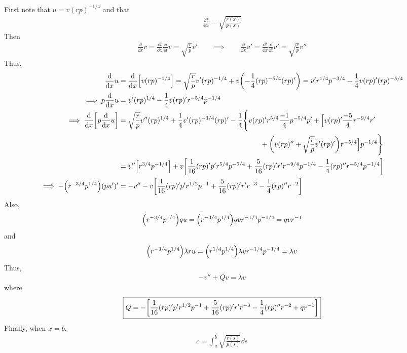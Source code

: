 \documentclass{article} %
\theoremstyle{plain}
\begin{document}
First note that $u = v(rp)^{-1/4}$ and that
\begin{align*}
    \frac{\dd t}{\dd x} = \sqrt{\frac{r(x)}{p(x)}}
\end{align*}
Then
\begin{align*}
    \frac{\dd}{\dd x} v = \frac{\dd t}{\dd x} \frac{\dd}{\dd t} v = \sqrt{\frac{r}{p}}v' \qquad \implies \qquad \frac{\dd}{\dd x} v' = \frac{\dd t}{\dd x}\frac{\dd}{\dd t}v' = \sqrt{\frac{r}{p}}v''
\end{align*}
Thus,
\begin{align*}
    \frac{\dd}{\dd x}u &= \frac{\dd}{\dd x} \qty[v(rp)^{-1/4}] = \sqrt{\frac{r}{p}}v'(rp)^{-1/4} + v\qty(-\frac{1}{4}(rp)^{-5/4}(rp)') = v'r^{1/4}p^{-3/4} - \frac{1}{4}v(rp)'(rp)^{-5/4} \\
    \implies p\frac{\dd}{\dd x}u &= v'(rp)^{1/4} - \frac{1}{4}v(rp)'r^{-5/4}p^{-1/4} \\
    \implies \frac{\dd}{\dd x}\qty[p\frac{\dd}{\dd x}u] &= \sqrt{\frac{r}{p}}v''(rp)^{1/4} + \frac{1}{4}v'(rp)^{-3/4}(rp)' - \frac{1}{4}\Bigg\{v(rp)'r^{5/4}\frac{-1}{4}p^{-5/4}p' + \Big[v(rp)'\frac{-5}{4}r^{-9/4}r' \\
    & \qquad\qquad\qquad\qquad\qquad\qquad\qquad\qquad\qquad\qquad + \qty(v(rp)'' + \sqrt{\frac{r}{p}}v'(rp)')r^{-5/4}\Big]p^{-1/4}\Bigg\} \\
    &= v''\qty[r^{3/4}p^{-1/4}] + v\qty[\frac{1}{16}(rp)'p'r^{5/4}p^{-5/4} + \frac{5}{16}(rp)'r'r^{-9/4}p^{-1/4} - \frac{1}{4}(rp)''r^{-5/4}p^{-1/4}] \\
    \implies -\qty(r^{-3/4}p^{1/4})(pu')' &= -v'' - v\qty[\frac{1}{16}(rp)'p'r^{1/2}p^{-1} + \frac{5}{16}(rp)'r'r^{-3} - \frac{1}{4}(rp)''r^{-2}]
\end{align*}
Also,
\begin{align*}
    \qty(r^{-3/4}p^{1/4})qu = \qty(r^{-3/4}p^{1/4})qvr^{-1/4}p^{-1/4} = qvr^{-1}
\end{align*}
and
\begin{align*}
    \qty(r^{-3/4}p^{1/4})\lambda r u = \qty(r^{1/4}p^{1/4})\lambda v r^{-1/4}p^{-1/4} = \lambda v
\end{align*}
Thus,
\begin{align*}
    -v'' + Qv = \lambda v
\end{align*}
where
\begin{align*}
    \boxed{Q = -\qty[\frac{1}{16}(rp)'p'r^{1/2}p^{-1} + \frac{5}{16}(rp)'r'r^{-3} - \frac{1}{4}(rp)''r^{-2} + qr^{-1}]}
\end{align*}
Finally, when $x = b$,
\begin{align*}
    \boxed{c = \int_a^b\sqrt{\frac{r(s)}{p(s)}}\dd s}
\end{align*}
\end{document}
